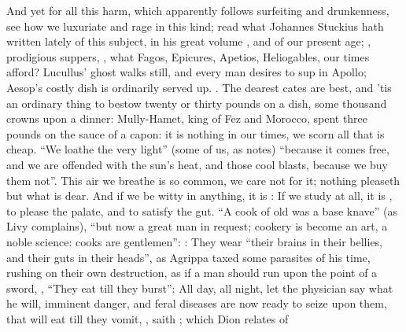 And yet for all this harm, which apparently follows surfeiting and drunkenness,
see how we luxuriate and rage in this kind; read what Johannes Stuckius hath
written lately of this subject, in his great volume , and of our present age; , prodigious suppers, , what Fagos,
Epicures, Apetios, Heliogables, our times afford? Lucullus' ghost walks
still, and every man
desires to sup in Apollo; Aesop's costly dish is ordinarily served up.
. The dearest
cates are best, and 'tis an ordinary thing to bestow twenty or thirty pounds on
a dish, some thousand crowns upon a dinner: Mully-Hamet,
king of Fez and Morocco, spent three pounds on the sauce of a capon: it is
nothing in our times, we scorn all that is cheap. \enquote{We loathe the very
light} (some of us, as \Seneca{} notes) \enquote{because it comes
free, and we are offended with the sun's heat, and those cool blasts, because
we buy them not}. This air we breathe is so common, we care not for it; nothing
pleaseth but what is dear. And if we be witty in anything,
it is : If we study at all, it is , to please the
palate, and to satisfy the gut. \enquote{A cook of old was a base knave} (as
Livy complains), \enquote{but now a great man in request; cookery
is become an art, a noble science: cooks are gentlemen}: : They
wear \enquote{their brains in their bellies, and their guts in their heads}, as
Agrippa taxed some parasites of his time, rushing on their
own destruction, as if a man should run upon the point of a sword, , \enquote{They eat till they burst}: All
day, all night, let the physician say what he will, imminent danger, and feral
diseases are now ready to seize upon them, that will eat till they vomit,
, saith \Seneca{}; which Dion relates of
